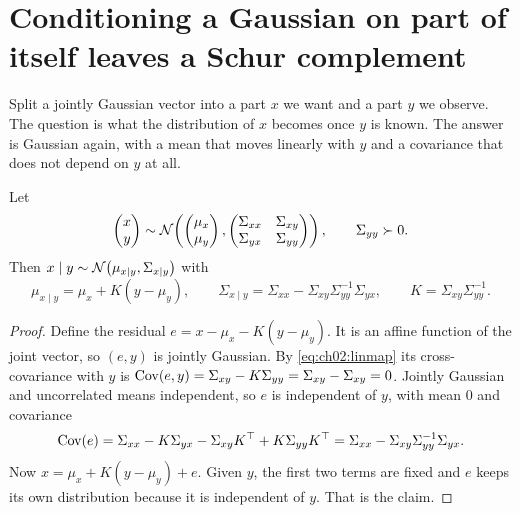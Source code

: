 
\section{Conditioning a Gaussian on part of itself leaves a Schur complement}\label{sec:ch02:cond}

Split a jointly Gaussian vector into a part $x$ we want and a part $y$ we
observe. The question is what the distribution of $x$ becomes once $y$ is
known. The answer is Gaussian again, with a mean that moves linearly with $y$
and a covariance that does not depend on $y$ at all.

\begin{theorem}\label{thm:ch02:cond}
Let
\[
\begin{pmatrix}x\\y\end{pmatrix}\sim\mathcal{N}\!\left(\begin{pmatrix}\mu_x\\\mu_y\end{pmatrix},
\begin{pmatrix}\Sigma_{xx}&\Sigma_{xy}\\\Sigma_{yx}&\Sigma_{yy}\end{pmatrix}\right),\qquad \Sigma_{yy}\succ0 .
\]
Then $x\mid y\sim\mathcal{N}\big(\mu_{x\mid y},\Sigma_{x\mid y}\big)$ with
\begin{equation}\label{eq:ch02:cond}
\mu_{x\mid y}=\mu_x+K(y-\mu_y),\qquad
\Sigma_{x\mid y}=\Sigma_{xx}-\Sigma_{xy}\Sigma_{yy}^{-1}\Sigma_{yx},\qquad
K=\Sigma_{xy}\Sigma_{yy}^{-1}.
\end{equation}
\end{theorem}

\begin{proof}
Define the residual $e=x-\mu_x-K(y-\mu_y)$. It is an affine function of the
joint vector, so $(e,y)$ is jointly Gaussian. By \cref{eq:ch02:linmap} its
cross-covariance with $y$ is
$\operatorname{Cov}(e,y)=\Sigma_{xy}-K\Sigma_{yy}=\Sigma_{xy}-\Sigma_{xy}=0$. Jointly Gaussian
and uncorrelated means independent, so $e$ is independent of $y$, with mean $0$
and covariance
\[
\operatorname{Cov}(e)=\Sigma_{xx}-K\Sigma_{yx}-\Sigma_{xy}K^{\top}+K\Sigma_{yy}K^{\top}
=\Sigma_{xx}-\Sigma_{xy}\Sigma_{yy}^{-1}\Sigma_{yx}.
\]
Now $x=\mu_x+K(y-\mu_y)+e$. Given $y$, the first two terms are fixed and $e$
keeps its own distribution because it is independent of $y$. That is the claim.
\end{proof}

